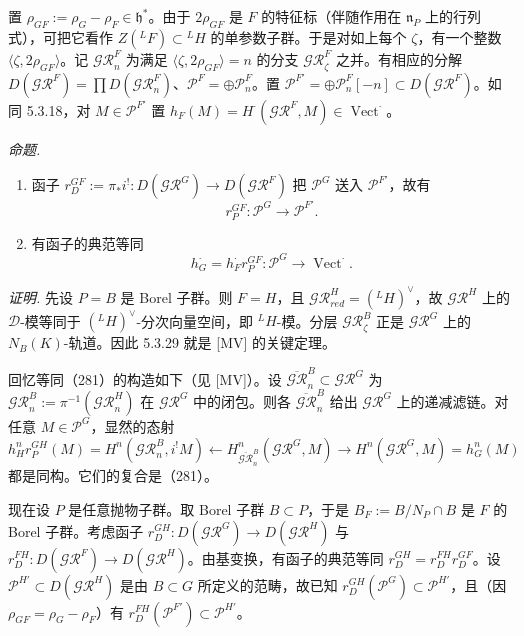 置 $\rho_{GF}:=\rho_G-\rho_F\in\mathfrak{h}^*$。由于 $2\rho_{GF}$ 是 $F$ 的特征标（伴随作用在 $\mathfrak{n}_P$ 上的行列式），可把它看作 $Z({}^{L}F)\subset{}^{L}H$ 的单参数子群。于是对如上每个 $\zeta$，有一个整数 $\langle\zeta,2\rho_{GF}\rangle$。记 $\mathcal{GR}^F_n$ 为满足 $\langle\zeta,2\rho_{GF}\rangle=n$ 的分支 $\mathcal{GR}^F_{\zeta}$ 之并。有相应的分解 $D(\mathcal{GR}^F)=\prod D(\mathcal{GR}^F_n)$、$\mathcal{P}^F=\oplus\mathcal{P}^F_n$。置 $\mathcal{P}^{F'}=\oplus\mathcal{P}^F_n[-n]\subset D(\mathcal{GR}^F)$。如同 5.3.18，对 $M\in\mathcal{P}^{F'}$ 置 $h_F(M)=H^{\cdot}(\mathcal{GR}^F,M)\in\operatorname{Vect}^{\cdot}$。

 \emph{命题.}
\begin{enumerate}[label=(\roman*),leftmargin=2.2em]
\item 函子 $r_D^{GF}:=\pi_*i^{!}:D(\mathcal{GR}^G)\to D(\mathcal{GR}^F)$ 把 $\mathcal{P}^G$ 送入 $\mathcal{P}^{F'}$，故有
\begin{equation}\tag{280}
r_P^{GF}:\mathcal{P}^G\to\mathcal{P}^{F'}.
\end{equation}
\item 有函子的典范等同
\begin{equation}\tag{281}
h_G^{\cdot}=h_F^{\cdot}r_P^{GF}:\mathcal{P}^G\to\operatorname{Vect}^{\cdot}.
\end{equation}
\end{enumerate}

\emph{证明.} 先设 $P=B$ 是 Borel 子群。则 $F=H$，且 $\mathcal{GR}^H_{red}=({}^{L}H)^{\vee}$，故 $\mathcal{GR}^H$ 上的 $\mathcal{D}$-模等同于 $({}^{L}H)^{\vee}$-分次向量空间，即 ${}^{L}H$-模。分层 $\mathcal{GR}^B_{\zeta}$ 正是 $\mathcal{GR}^G$ 上的 $N_B(K)$-轨道。因此 5.3.29 就是 [MV] 的关键定理。

回忆等同（281）的构造如下（见 [MV]）。设 $\overline{\mathcal{GR}}^B_n\subset\mathcal{GR}^G$ 为 $\mathcal{GR}^B_n:=\pi^{-1}(\mathcal{GR}^H_n)$ 在 $\mathcal{GR}^G$ 中的闭包。则各 $\overline{\mathcal{GR}}^B_n$ 给出 $\mathcal{GR}^G$ 上的递减滤链。对任意 $M\in\mathcal{P}^G$，显然的态射
\[
h^n_Hr_P^{GH}(M)=H^n(\mathcal{GR}^B_n,i^{!}M)\leftarrow H^n_{\overline{\mathcal{GR}}^B_n}(\mathcal{GR}^G,M)\rightarrow H^n(\mathcal{GR}^G,M)=h^n_G(M)
\]
都是同构。它们的复合是（281）。

现在设 $P$ 是任意抛物子群。取 Borel 子群 $B\subset P$，于是 $B_F:=B/N_P\cap B$ 是 $F$ 的 Borel 子群。考虑函子 $r_D^{GH}:D(\mathcal{GR}^G)\to D(\mathcal{GR}^H)$ 与 $r_D^{FH}:D(\mathcal{GR}^F)\to D(\mathcal{GR}^H)$。由基变换，有函子的典范等同 $r_D^{GH}=r_D^{FH}r_D^{GF}$。设
$\mathcal{P}^{H'}\subset D(\mathcal{GR}^H)$ 是由 $B\subset G$ 所定义的范畴，故已知 $r_D^{GH}(\mathcal{P}^G)\subset\mathcal{P}^{H'}$，且（因 $\rho_{GF}=\rho_G-\rho_F$）有 $r_D^{FH}(\mathcal{P}^{F'})\subset\mathcal{P}^{H'}$。

